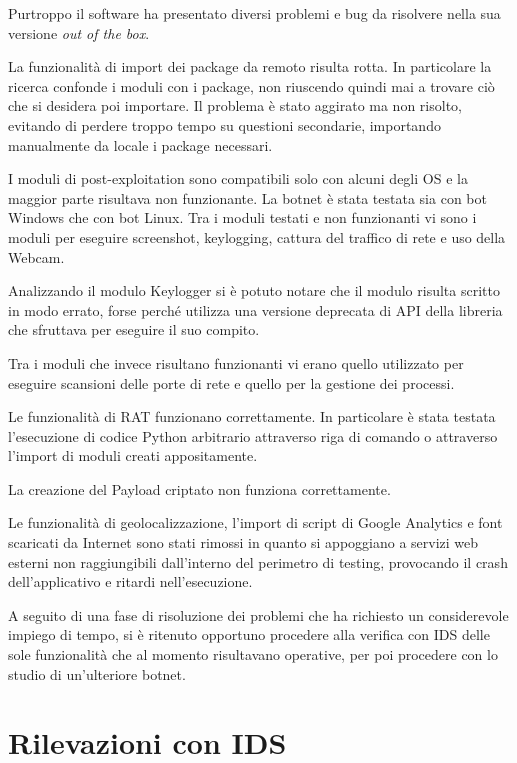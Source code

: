 Purtroppo il software ha presentato diversi problemi e bug da risolvere nella sua versione \textit{out of the box}. 

La funzionalità di import dei   package da remoto risulta rotta. In particolare la ricerca confonde i moduli con i package,  non riuscendo quindi mai a trovare ciò che si desidera poi importare. Il problema è stato aggirato ma non risolto, evitando di perdere troppo tempo su questioni secondarie, importando manualmente da locale i package necessari.

I moduli di post-exploitation sono compatibili solo con alcuni degli OS e la maggior parte risultava non funzionante. 
La botnet è stata testata sia con bot Windows che con bot Linux.
Tra i moduli  testati e non funzionanti vi sono i moduli per eseguire screenshot, keylogging, cattura del traffico di rete e uso della  Webcam.

Analizzando il modulo Keylogger si è potuto notare che il modulo risulta scritto in modo errato, forse perché utilizza una versione deprecata di API della libreria che sfruttava per eseguire il suo compito. 

Tra i moduli che invece risultano funzionanti vi erano quello utilizzato per eseguire scansioni delle porte di rete e quello per la gestione dei processi.

Le funzionalità di RAT funzionano correttamente.
In particolare è stata testata l'esecuzione di codice Python arbitrario attraverso riga di comando o  attraverso l'import di moduli creati appositamente.

La  creazione del Payload criptato non funziona correttamente.


Le funzionalità di geolocalizzazione, l'import di script di Google Analytics e font scaricati da Internet sono stati rimossi in quanto si appoggiano a servizi web esterni non raggiungibili dall'interno del perimetro di testing, provocando  il crash dell'applicativo e ritardi nell'esecuzione.



A seguito di una fase di risoluzione dei problemi che ha richiesto un considerevole impiego di tempo, si è ritenuto opportuno procedere alla verifica con IDS delle sole funzionalità che al momento risultavano operative, per poi procedere con lo studio di un'ulteriore botnet.

\section{Rilevazioni con IDS}


